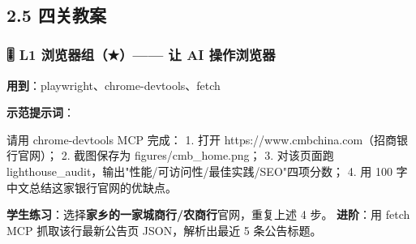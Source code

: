 \documentclass[
  american,
  chinese,
]{ctexart}
\begin{document}
\foreignlanguage{american}{}

~

\subsection{\texorpdfstring{\foreignlanguage{american}{2.5 }{\foreignlanguage{american}{四关教案}}}{2.5 四关教案}}\label{ux56dbux5173ux6559ux6848}

\subsubsection{\texorpdfstring{\foreignlanguage{american}{🎚️ L1 }{浏览器组（}\foreignlanguage{american}{★}{）}\foreignlanguage{american}{------ }{让}\foreignlanguage{american}{ AI }{操作浏览器}\foreignlanguage{american}{}}{🎚️ L1 浏览器组（★）------ 让 AI 操作浏览器}}\label{l1-ux6d4fux89c8ux5668ux7ec4-ux8ba9-ai-ux64cdux4f5cux6d4fux89c8ux5668}

{\textbf{\foreignlanguage{american}{用到}}\foreignlanguage{american}{：}\foreignlanguage{american}{playwright}\foreignlanguage{american}{、}\foreignlanguage{american}{chrome-devtools}\foreignlanguage{american}{、}\foreignlanguage{american}{fetch}}

{\textbf{\foreignlanguage{american}{示范提示词}}}\foreignlanguage{american}{：}

{\foreignlanguage{american}{请用}}\foreignlanguage{american}{ chrome-{devtools} MCP }{\foreignlanguage{american}{完成}}\foreignlanguage{american}{：}\foreignlanguage{american}{ 1. }{\foreignlanguage{american}{打开}}\foreignlanguage{american}{ https://www.cmbchina.com}\foreignlanguage{american}{（招商银行官网）；}\foreignlanguage{american}{ 2. }{\foreignlanguage{american}{截图保存为}}\foreignlanguage{american}{ figures/cmb\_home.png}\foreignlanguage{american}{；}\foreignlanguage{american}{ 3. }{\foreignlanguage{american}{对该页面跑}}\foreignlanguage{american}{ {lighthouse\_audit{，输出}"{性能}}/}{\foreignlanguage{american}{可访问性}}\foreignlanguage{american}{/}{\foreignlanguage{american}{最佳实践}}\foreignlanguage{american}{/{SEO"{四项分数}}}\foreignlanguage{american}{；}\foreignlanguage{american}{ 4. }\foreignlanguage{american}{用}\foreignlanguage{american}{ 100 }{\foreignlanguage{american}{字中文总结这家银行官网的优缺点}}\foreignlanguage{american}{。}\foreignlanguage{american}{ }

\textbf{{学生练习}}{：选择\textbf{家乡的{一家城商行}}}\textbf{\foreignlanguage{american}{/}{农商行}}{官网，重复上述}\foreignlanguage{american}{ 4 }{步。}{ }\textbf{{进阶}}{：用}\foreignlanguage{american}{ fetch MCP }{抓取该行最新公告页}\foreignlanguage{american}{ JSON}{，解析{出最近}}\foreignlanguage{american}{ 5 }{条公告标题。}\foreignlanguage{american}{}
\end{document}
